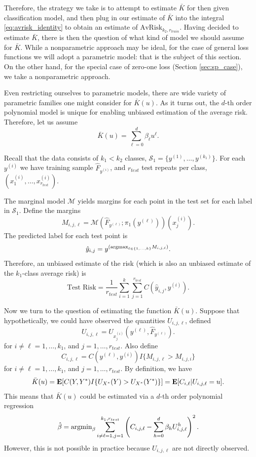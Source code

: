 \documentclass[12pt]{article}
\begin{document}
Therefore, the strategy we take is to attempt to estimate $\bar{K}$
for then given classification model, and then plug in our estimate of
$\bar{K}$ into the integral \eqref{eq:avrisk_identity} to obtain an
estimate of $\text{AvRisk}_{k_2, r_{train}}$.  Having decided to
estimate $\bar{K}$, there is then the question of what kind of model
we should assume for $\bar{K}$.  While a nonparametric approach may be
ideal, for the case of general loss functions we will adopt a
parametric model: that is the subject of this section.  On the other
hand, for the special case of zero-one loss
(Section \ref{sec:sp_case}), we take a nonparametric approach.

Even restricting ourselves to parametric models, there are wide
variety of parametric families one might consider for $\bar{K}(u)$.
As it turns out, the $d$-th order polynomial model is unique for
enabling unbiased estimation of the average risk.  Therefore, let us
assume
\[
\bar{K}(u) = \sum_{\ell = 0}^d \beta_\ell u^\ell.
\]

Recall that the data consists of $k_1 < k_2$ classes, $\mathcal{S}_1 =
\{y^{(1)},\hdots, y^{(k_1)}\}$. For each $y^{(i)}$ we have training sample $\hat{F}_{y^{(i)}}$, and
$r_{test}$ test repeats per class, $(x_1^{(i)},\hdots,
x_{r_{test}}^{(i)})$.

The marginal model $\mathcal{M}$ yields margins for each point in the
test set for each label in $\mathcal{S}_1$.  Define the margins
\[
M_{i, j, \ell} = \mathcal{M}(\hat{F}_{y^{(\ell)}}; \pi_1(y^{(\ell)}))(x_j^{(i)}).
\]
The predicted label for each test point is
\[
\hat{y}_{i,j} = y^{(\text{argmax}_{\ell \in \{1,\hdots, k\}} M_{i, j, \ell})}.
\]
Therefore, an unbiased estimate of the risk (which is also an unbiased
estimate of the $k_1$-class average risk) is
\[
\text{Test Risk} = \frac{1}{r_{test}}\sum_{i=1}^k \sum_{j=1}^{r_{test}} C(\hat{y}_{i, j}, y^{(i)}).
\]

Now we turn to the question of estimating the function $\bar{K}(u)$.
Suppose that hypothetically, we could have observed the quantities
$U_{i, j, \ell}$, defined
\[
U_{i, j, \ell} = U_{x_j^{(i)}}(y^{(\ell)}, \hat{F}_{y^{(\ell)}}).
\]
for $i \neq \ell = 1,\hdots, k_1$, and $j = 1,\hdots, r_{test}$.
Also define
\[
C_{i,j, \ell} = C(y^{(\ell)}, y^{(i)})I\{M_{i, j, \ell} > M_{i, j, i}\}
\]
for $i \neq \ell = 1,\hdots, k_1$, and $j = 1,\hdots, r_{test}$.
By definition, we have
\[
\bar{K}(u) = \textbf{E}[C(Y, Y^*)I\{U_{X^*}(Y) > U_{X^*}(Y^*)\}] = \textbf{E}[C_{i,\ell} | U_{i, j, \ell} = u].
\]
This means that $\bar{K}(u)$ could be estimated via a $d$-th order polynomial regression
\[
\hat{\beta} = \text{argmin}_{\beta} \sum_{i\neq \ell=1, j = 1}^{k_1, r_{test}} \left(C_{i,j,\ell} - \sum_{h=0}^d \beta_h U_{i,j, \ell}^h\right)^2.
\]
However, this is not possible in
practice because $U_{i,j,\ell}$ are not directly observed.
\end{document}
